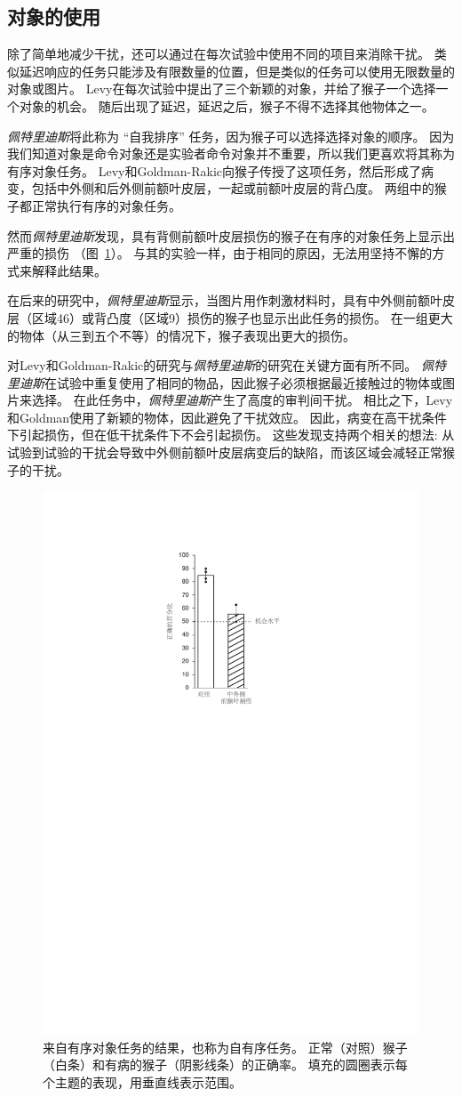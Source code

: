 \subsection{对象的使用}

除了简单地减少干扰，还可以通过在每次试验中使用不同的项目来消除干扰。
类似延迟响应的任务只能涉及有限数量的位置，但是类似的任务可以使用无限数量的对象或图片。
Levy\cite{levy1999association}在每次试验中提出了三个新颖的对象，并给了猴子一个选择一个对象的机会。
随后出现了延迟，延迟之后，猴子不得不选择其他物体之一。


\textit{佩特里迪斯}\cite{petrides1995impairments}将此称为 “自我排序” 任务，因为猴子可以选择选择对象的顺序。
因为我们知道对象是命令对象还是实验者命令对象并不重要，所以我们更喜欢将其称为有序对象任务。
Levy和Goldman-Rakic向猴子传授了这项任务，然后形成了病变，包括中外侧和后外侧前额叶皮层，一起或前额叶皮层的背凸度。
两组中的猴子都正常执行有序的对象任务。


然而\textit{佩特里迪斯}\cite{petrides1995impairments}发现，具有背侧前额叶皮层损伤的猴子在有序的对象任务上显示出严重的损伤 （图~\ref{fig:6_4}）。
与其的实验一样，由于相同的原因，无法用坚持不懈的方式来解释此结果。


在后来的研究中，\textit{佩特里迪斯}\cite{petrides2000dissociable}显示，当图片用作刺激材料时，具有中外侧前额叶皮层（区域46）或背凸度（区域9）损伤的猴子也显示出此任务的损伤。
在一组更大的物体（从三到五个不等）的情况下，猴子表现出更大的损伤。


对Levy和Goldman-Rakic的研究与\textit{佩特里迪斯}的研究在关键方面有所不同。
\textit{佩特里迪斯}在试验中重复使用了相同的物品，因此猴子必须根据最近接触过的物体或图片来选择。
在此任务中，\textit{佩特里迪斯}产生了高度的审判间干扰。
相比之下，Levy和Goldman使用了新颖的物体，因此避免了干扰效应。
因此，病变在高干扰条件下引起损伤，但在低干扰条件下不会引起损伤。
这些发现支持两个相关的想法: 从试验到试验的干扰会导致中外侧前额叶皮层病变后的缺陷，而该区域会减轻正常猴子的干扰。


\begin{figure}
	\centering
	\includegraphics[width=0.44\linewidth]{chap6/6_4}
	\caption{来自有序对象任务的结果，也称为自有序任务。
		正常（对照）猴子（白条）和有病的猴子（阴影线条）的正确率。
		填充的圆圈表示每个主题的表现，用垂直线表示范围\cite{petrides1995impairments}。}
	\label{fig:6_4}
\end{figure}



